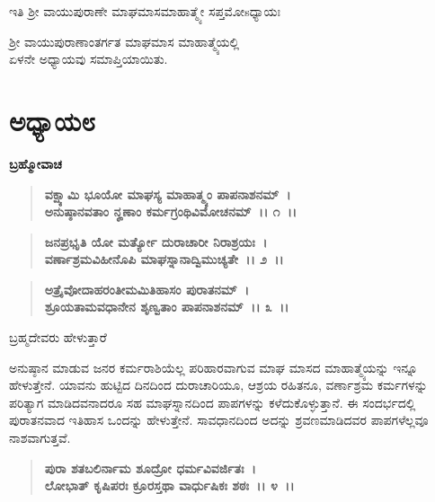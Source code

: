 \begin{center}
ಇತಿ ಶ‍್ರೀ ವಾಯುಪುರಾಣೇ ಮಾಘಮಾಸಮಾಹಾತ್ಮ್ಯೇ ಸಪ್ತಮೋsಧ್ಯಾಯಃ 
\end{center}

\begin{center}
ಶ‍್ರೀ ವಾಯುಪುರಾಣಾಂತರ್ಗತ ಮಾಘಮಾಸ ಮಾಹಾತ್ಮ್ಯೆಯಲ್ಲಿ \\ ಏಳನೇ ಅಧ್ಯಾಯವು ಸಮಾಪ್ತಿಯಾಯಿತು.
\end{center}

\newpage

\section*{ಅಧ್ಯಾಯ೮}

\emptypage

\begin{flushleft}
\textbf{ಬ್ರಹ್ಮೋವಾಚ }
\end{flushleft}

\begin{verse}
\textbf{ವಕ್ಷ್ಯಾಮಿ ಭೂಯೋ ಮಾಘಸ್ಯ ಮಾಹಾತ್ಮ್ಯಂ ಪಾಪನಾಶನಮ್~।}\\\textbf{ಅನುಷ್ಠಾನವತಾಂ ನೄಣಾಂ ಕರ್ಮಗ್ರಂಥಿವಿಮೋಚನಮ್~।। ೧~।। }
\end{verse}

\begin{verse}
\textbf{ಜನಪ್ರಭೃತಿ ಯೋ ಮರ್ತ್ಯೋ ದುರಾಚಾರೀ ನಿರಾಶ್ರಯಃ~।}\\\textbf{ವರ್ಣಾಶ್ರಮವಿಹೀನೊಪಿ ಮಾಘಸ್ನಾನಾದ್ವಿಮುಚ್ಯತೇ~।। ೨~।।}
\end{verse}

\begin{verse}
\textbf{ಅತ್ರೈವೋದಾಹರಂತೀಮಮಿತಿಹಾಸಂ ಪುರಾತನಮ್~।}\\\textbf{ಶ್ರೂಯತಾಮವಧಾನೇನ ಶೃಣ್ವತಾಂ ಪಾಪನಾಶನಮ್~।। ೩~।। }
\end{verse}

\begin{flushleft}
ಬ್ರಹ್ಮದೇವರು ಹೇಳುತ್ತಾರೆ
\end{flushleft}

ಅನುಷ್ಠಾನ ಮಾಡುವ ಜನರ ಕರ್ಮರಾಶಿಯೆಲ್ಲ ಪರಿಹಾರವಾಗುವ ಮಾಘ ಮಾಸದ ಮಾಹಾತ್ಮ್ಯೆಯನ್ನು ಇನ್ನೂ ಹೇಳುತ್ತೇನೆ. ಯಾವನು ಹುಟ್ಟಿದ ದಿನದಿಂದ ದುರಾಚಾರಿಯೂ, ಆಶ್ರಯ ರಹಿತನೂ, ವರ್ಣಾಶ್ರಮ ಕರ್ಮಗಳನ್ನು ಪರಿತ್ಯಾಗ ಮಾಡಿದವನಾದರೂ ಸಹ ಮಾಘಸ್ನಾನದಿಂದ ಪಾಪಗಳನ್ನು ಕಳೆದುಕೊಳ್ಳುತ್ತಾನೆ. ಈ ಸಂದರ್ಭದಲ್ಲಿ ಪುರಾತನವಾದ ಇತಿಹಾಸ ಒಂದನ್ನು ಹೇಳುತ್ತೇನೆ. ಸಾವಧಾನದಿಂದ ಅದನ್ನು ಶ್ರವಣಮಾಡಿದವರ ಪಾಪಗಳೆಲ್ಲವೂ ನಾಶವಾಗುತ್ತವೆ.

\begin{verse}
\textbf{ಪುರಾ ಶತಬಲಿರ್ನಾಮ ಶೂದ್ರೋ ಧರ್ಮವಿವರ್ಜಿತಃ~।}\\\textbf{ಲೋಭಾತ್ ಕೃಷಿಪರಃ ಕ್ರೂರಸ್ತಥಾ ವಾರ್ಧುಷಿಕಃ ಶಠಃ~।। ೪~।। }
\end{verse}

